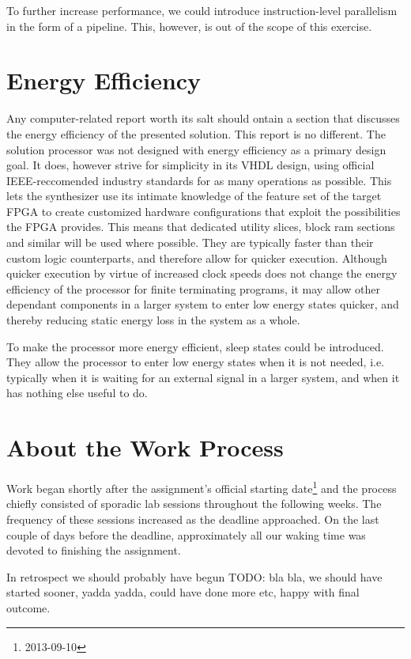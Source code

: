 To further increase performance, we could introduce instruction-level parallelism in the form of a pipeline.
This, however, is out of the scope of this exercise.

\section{Energy Efficiency}

Any computer-related report worth its salt should ontain a section that discusses the energy efficiency of the presented solution.
This report is no different.
The solution processor was not designed with energy efficiency as a primary design goal.
It does, however strive for simplicity in its VHDL design, using official IEEE-reccomended industry standards for as many operations as possible.
This lets the synthesizer use its intimate knowledge of the feature set of the target FPGA to create customized hardware configurations that exploit the possibilities the FPGA provides.
This means that dedicated utility slices, block ram sections and similar will be used where possible.
They are typically faster than their custom logic counterparts, and therefore allow for quicker execution.
Although quicker execution by virtue of increased clock speeds does not change the energy efficiency of the processor for finite terminating programs, it may allow other dependant components in a larger system to enter low energy states quicker, and thereby reducing static energy loss in the system as a whole.

To make the processor more energy efficient, sleep states could be introduced.
They allow the processor to enter low energy states when it is not needed, i.e. typically when it is waiting for an external signal in a larger system, and when it has nothing else useful to do.

\section{About the Work Process}

Work began shortly after the assignment's official starting date\footnote{2013-09-10} and the process chiefly consisted of sporadic lab sessions throughout the following weeks.
The frequency of these sessions increased as the deadline approached.
On the last couple of days before the deadline, approximately all our waking time was devoted to finishing the assignment.

In retrospect we should probably have begun 
TODO: bla bla, we should have started sooner, yadda yadda, could have done more etc, happy with final outcome.

